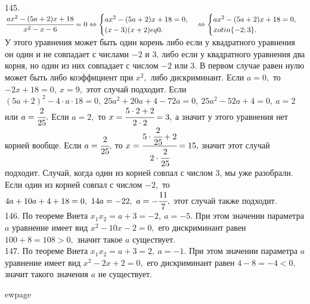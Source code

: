 145. $\cfrac{ax^2-(5a+2)x+18}{x^2-x-6}=0\Leftrightarrow \begin{cases}
ax^2-(5a+2)x+18=0,\\ (x-3)(x+2)
eq0.\end{cases}\Leftrightarrow \begin{cases}
ax^2-(5a+2)x+18=0,\\ x
otin\{-2;3\}.\end{cases}$ У этого уравнения может быть один корень либо если у квадратного уравнения он один и не совпадает с числами $-2$ и 3, либо если у квадратного уравнения два корня, но один из них совпадает с числом $-2$ или 3. В первом случае равен нулю может быть либо коэффициент при $x^2,$ либо дискриминант. Если $a=0,$ то $-2x+18=0,\ x=9,$ этот случай подходит. Если $(5a+2)^2-4\cdot a\cdot18=0,\ 25a^2+20a+4-72a=0,\
25a^2-52a+4=0,\ a=2$ или $a=\cfrac{2}{25}.$ Если $a=2,$ то $x=\cfrac{5\cdot2+2}{2\cdot2}=3,$ а значит у этого уравнения нет корней вообще. Если $a=\cfrac{2}{25},$ то $x=\cfrac{5\cdot\cfrac{2}{25}+2}{2\cdot\cfrac{2}{25}}=15,$ значит этот случай подходит. Случай, когда один из корней совпал с числом 3, мы уже разобрали. Если один из корней совпал с числом $-2,$ то $4a+10a+4+18=0,\ 14a=-22,\ a=-\cfrac{11}{7},$ этот случай также подходит.\\
146. По теореме Виета $x_1x_2=a+3=-2,\ a=-5.$ При этом значении параметра $a$ уравнение имеет вид $x^2-10x-2=0,$ его дискриминант равен $100+8=108>0,$ значит такое $a$ существует.\\
147. По теореме Виета $x_1x_2=a+3=2,\ a=-1.$ При этом значении параметра $a$ уравнение имеет вид $x^2-2x+2=0,$ его дискриминант равен $4-8=-4<0,$ значит такого значения $a$ не существует.

ewpage
